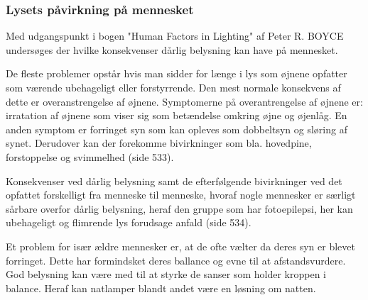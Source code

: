\subsubsection{Lysets påvirkning på mennesket} 
\label{sec:konsekvenser}

Med udgangspunkt i bogen "Human Factors in Lighting" af Peter R. BOYCE undersøges der hvilke konsekvenser dårlig belysning kan have på mennesket. 

De fleste problemer opstår hvis man sidder for længe i lys som øjnene opfatter som værende ubehageligt eller forstyrrende. Den mest normale konsekvens af dette er overanstrengelse af øjnene. Symptomerne på overantrengelse af øjnene er: irratation af øjnene som viser sig som betændelse omkring øjne og øjenlåg. En anden symptom er forringet syn som kan opleves som dobbeltsyn og sløring af synet. Derudover kan der forekomme bivirkninger som bla. hovedpine, forstoppelse og svimmelhed \cite{human_factors}(side 533).

Konsekvenser ved dårlig belysning samt de efterfølgende bivirkninger ved det opfattet forskelligt fra menneske til menneske, hvoraf nogle mennesker er særligt sårbare overfor dårlig belysning, heraf den gruppe som har fotoepilepsi, her kan ubehageligt og flimrende lys forudsage anfald \cite{human_factors}(side 534). 

Et problem for især ældre mennesker er, at de ofte vælter da deres syn er blevet forringet. Dette har formindsket deres ballance og evne til at afstandsvurdere. God belysning kan være med til at styrke de sanser som holder kroppen i balance. Heraf kan natlamper blandt andet være en løsning om natten. 